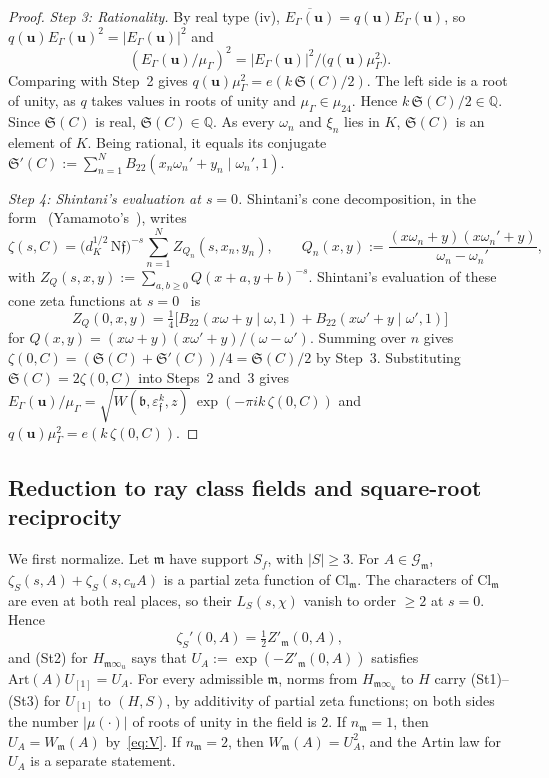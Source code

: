 \documentclass[11pt]{amsart}
\numberwithin{equation}{section}
\theoremstyle{plain}
\theoremstyle{definition}
\theoremstyle{remark}
\begin{document}
\begin{proof}
\emph{Step 3: Rationality.} By real type (iv), \(\overline{E_\Gamma(\mathbf u)}=q(\mathbf u)E_\Gamma(\mathbf u)\), so \(q(\mathbf u)E_\Gamma(\mathbf u)^2=|E_\Gamma(\mathbf u)|^2\) and
\[(E_\Gamma(\mathbf u)/\mu_\Gamma)^2=|E_\Gamma(\mathbf u)|^2/\bigl(q(\mathbf u)\mu_\Gamma^2\bigr).\]
Comparing with Step~2 gives \(q(\mathbf u)\mu_\Gamma^2=e(k\,\mathfrak S(C)/2)\). The left side is a root of unity, as \(q\) takes values in roots of unity and \(\mu_\Gamma\in\mu_{24}\). Hence \(k\,\mathfrak S(C)/2\in\mathbb Q\). Since \(\mathfrak S(C)\) is real, \(\mathfrak S(C)\in\mathbb Q\). As every \(\omega_n\) and \(\xi_n\) lies in \(K\), \(\mathfrak S(C)\) is an element of \(K\). Being rational, it equals its conjugate \(\mathfrak S'(C):=\sum_{n=1}^NB_{22}(x_n\omega_n'+y_n\mid\omega_n',1)\).

\emph{Step 4: Shintani's evaluation at \(s=0\).} Shintani's cone decomposition, in the form~\cite[Prop.~3]{RW} (Yamamoto's~\cite[Prop.~2.1.4]{Ya08}), writes
\[\zeta(s,C)=\bigl(d_K^{1/2}\,\mathrm N\mathfrak f\bigr)^{-s}\sum_{n=1}^NZ_{Q_n}(s,x_n,y_n),\qquad Q_n(x,y):=\frac{(x\omega_n+y)(x\omega_n'+y)}{\omega_n-\omega_n'},\]
with \(Z_Q(s,x,y):=\sum_{a,b\ge0}Q(x+a,y+b)^{-s}\). Shintani's evaluation of these cone zeta functions at \(s=0\)~\cite{Sh76} is
\[Z_Q(0,x,y)=\tfrac14\bigl[B_{22}(x\omega+y\mid\omega,1)+B_{22}(x\omega'+y\mid\omega',1)\bigr]\]
for \(Q(x,y)=(x\omega+y)(x\omega'+y)/(\omega-\omega')\). Summing over \(n\) gives \(\zeta(0,C)=(\mathfrak S(C)+\mathfrak S'(C))/4=\mathfrak S(C)/2\) by Step~3. Substituting \(\mathfrak S(C)=2\zeta(0,C)\) into Steps~2 and~3 gives \(E_\Gamma(\mathbf u)/\mu_\Gamma=\sqrt{W(\mathfrak b,\varepsilon_{\mathfrak f}^k,z)}\,\exp(-\pi ik\,\zeta(0,C))\) and \(q(\mathbf u)\mu_\Gamma^2=e(k\,\zeta(0,C))\).
\end{proof}

\subsection{Reduction to ray class fields and square-root reciprocity}\label{sec:raycl}

We first normalize. Let \(\mathfrak m\) have support \(S_f\), with \(|S|\ge3\). For \(A\in\mathcal G_{\mathfrak m}\), \(\zeta_S(s,A)+\zeta_S(s,c_uA)\) is a partial zeta function of \(\mathrm{Cl}_{\mathfrak m}\). The characters of \(\mathrm{Cl}_{\mathfrak m}\) are even at both real places, so their \(L_S(s,\chi)\) vanish to order \(\ge2\) at \(s=0\). Hence
\[\zeta_S'(0,A)=\tfrac12Z'_{\mathfrak m}(0,A),\]
and (St2) for \(H_{\mathfrak m\infty_u}\) says that \(U_A:=\exp(-Z'_{\mathfrak m}(0,A))\) satisfies \(\mathrm{Art}(A)U_{[1]}=U_A\). For every admissible \(\mathfrak m\), norms from \(H_{\mathfrak m\infty_u}\) to \(H\) carry (St1)--(St3) for \(U_{[1]}\) to \((H,S)\), by additivity of partial zeta functions; on both sides the number \(|\mu(\cdot)|\) of roots of unity in the field is \(2\). If \(n_{\mathfrak m}=1\), then \(U_A=W_{\mathfrak m}(A)\) by~\eqref{eq:V}. If \(n_{\mathfrak m}=2\), then \(W_{\mathfrak m}(A)=U_A^2\), and the Artin law for \(U_A\) is a separate statement.
\end{document}
